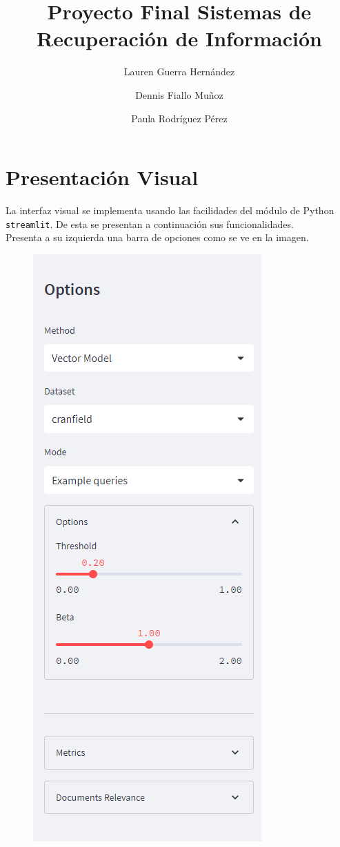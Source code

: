 \documentclass[spanish]{article}
\title{Proyecto Final Sistemas de Recuperación de Información}
\author{Lauren Guerra Hernández \and Dennis Fiallo Muñoz \and Paula Rodríguez Pérez}
\begin{document}
\maketitle

\section*{Presentación Visual}
	La interfaz visual se implementa usando las facilidades del módulo de Python \texttt{streamlit}. De esta se presentan a continuación sus funcionalidades.\\

	Presenta a su izquierda una barra de opciones como se ve en la imagen.

	\begin{multicols}{2}
		\begin{figure}[H]
			\includegraphics[scale=0.5]{sidebar.png}
		\end{figure}	
	

\end{multicols}
\end{document}
